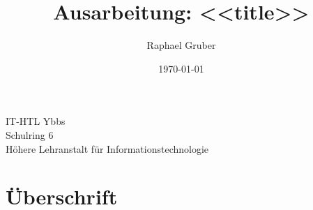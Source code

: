 \documentclass[a4paper, ngerman]{article}
\author{Raphael Gruber}
\title{Ausarbeitung: <<title>>}
\date{\origdate\today}
\begin{document}
\begin{titlingpage}

	\maketitle
	
	\vfill

	\begin{center}

		IT-HTL Ybbs \\

		Schulring 6 \\

		Höhere Lehranstalt für Informationstechnologie

	\end{center}

\end{titlingpage}


\newpage

\tableofcontents

\newpage

\section{Überschrift}
\end{document}
